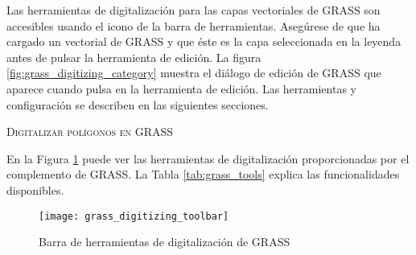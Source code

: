Las herramientas de digitalización para las capas vectoriales de GRASS son accesibles usando el icono  
de la barra de herramientas. Asegúrese de que ha cargado un vectorial de GRASS y que éste es la capa seleccionada en 
la leyenda antes de pulsar la herramienta de edición. La figura \ref{fig:grass_digitizing_category} muestra el diálogo
de edición de GRASS que aparece cuando pulsa en la herramienta de edición. Las herramientas y configuración se describen en las siguientes secciones.

\begin{Tip}\caption{\textsc{Digitalizar polígonos en GRASS}}
\end{Tip} 

\label{label_grasstoolbar}

En la Figura \ref{fig:grass_digitizing_toolbar} puede ver las herramientas de digitalización proporcionadas por el complemento de GRASS. La Tabla \ref{tab:grass_tools}
explica las funcionalidades disponibles.

\begin{figure}[h]
   \begin{center}
   \caption{Barra de herramientas de digitalización de GRASS \nixcaption}\label{fig:grass_digitizing_toolbar} 
   \texttt{[image: grass\_digitizing\_toolbar]}
\end{center}  
\end{figure}

